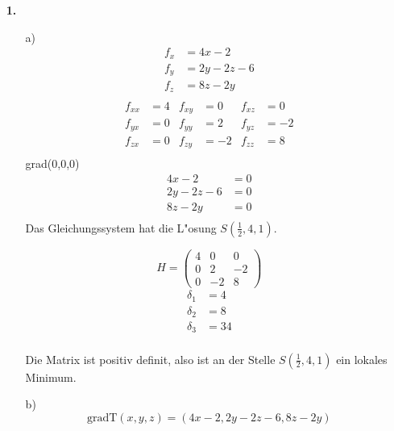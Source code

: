 \documentclass[a4paper,11pt,fleqn]{scrartcl}
\author{\authorinfo}
\title{\titleinfo}
\date{\today}
\begin{document}
\maketitle
\begin{enumerate}
    
\item[\textbf{1.}]
    \begin{enumerate}
        \item[a)]
            \begin{align*}
                f_x &= 4x -2\\
                f_y &= 2y -2z -6\\
                f_z &= 8z -2y\\
            \end{align*}
            \begin{align*}
                f_{xx} &= 4  & f_{xy}  &= 0 & f_{xz} &= 0\\
                f_{yx} &= 0  & f_{yy}  &= 2 & f_{yz} &= -2\\
                f_{zx} &= 0  & f_{zy}  &= -2 & f_{zz} &= 8\\
            \end{align*}
                grad(0,0,0)
            \begin{align*}
                4x -2 &= 0   \\
                2y -2z-6 &= 0\\
                8z - 2y &= 0 \\
            \end{align*}
            Das Gleichungssystem hat die L"osung $S(\frac{1}{2}, 4, 1)$.

            \[ H = \begin{pmatrix} 4 & 0 & 0\\ 0 & 2 & -2\\ 0 & -2 & 8 \end{pmatrix}\]
            \begin{align*}
                \delta_1 &= 4 \\
                \delta_2 &= 8\\
                \delta_3 &= 34\\
            \end{align*}

            Die Matrix ist positiv definit, also ist an der Stelle $S(\frac{1}{2}, 4, 1)$ ein lokales Minimum. 
        
        \item[b)]
            \[\text{gradT}(x,y,z) = (4x -2 , 2y -2z -6, 8z -2y)\]


\end{enumerate}
\end{enumerate}
\end{document}
